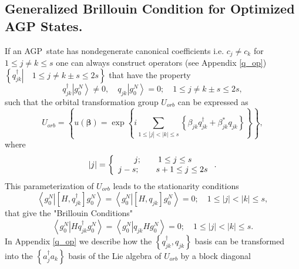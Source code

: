 \documentclass[titlepage]{article}%
\begin{document}
\subsection{Generalized Brillouin Condition for Optimized AGP
States.\label{Brillouin}}

If an AGP\ state has nondegenerate canonical coefficients i.e. $c_{j}\neq
c_{k}$ for $1\leq j\neq k\leq s$ one can \cite{AGPCoherent}\cite{Weiner83a}%
\cite{Kurtz83} always construct operators (see Appendix \ref{q_op}) $\left\{
\left.  q_{jk}^{\dagger}\right\vert \quad1\leq j\neq k\pm s\leq2s\right\}  $
that have the property
\begin{equation}
q_{jk}^{\dagger}\left\vert g_{0}^{N}\right\rangle \neq0,\quad q_{jk}\left\vert
g_{0}^{N}\right\rangle =0;\quad1\leq j\neq k\pm s\leq2s,
\end{equation}
such that the orbital transformation group $U_{orb}$ can be expressed as
\begin{equation}
U_{orb}=\left\{  u\left(  \bm{\beta}\right)  =\exp\left\{  i\sum
_{1\leq\left\vert j\right\vert <\left\vert k\right\vert \leq s}\left\{
\beta_{jk}q_{jk}^{\dagger}+\beta_{jk}^{\ast}q_{jk}\right\}  \right\}
\right\}  ,
\end{equation}
where
\begin{equation}
\left\vert j\right\vert =\left\{
\begin{array}
[c]{c}%
j;\qquad1\leq j\leq s\\
j-s;\qquad s+1\leq j\leq2s
\end{array}
\right.  .
\end{equation}
This parameterization of $U_{orb}$ leads to the stationarity conditions
\begin{equation}
\left\langle \left.  g_{0}^{N}\right\vert \left[  H,q_{jk}^{\dagger}\right]
g_{0}^{N}\right\rangle =\left\langle \left.  g_{0}^{N}\right\vert \left[
H,q_{jk}\right]  g_{0}^{N}\right\rangle =0;\quad1\leq\left\vert j\right\vert
<\left\vert k\right\vert \leq s,
\end{equation}
that give the "Brillouin Conditions"
\begin{equation}
\left\langle \left.  g_{0}^{N}\right\vert Hq_{jk}^{\dagger}g_{0}%
^{N}\right\rangle =\left\langle \left.  g_{0}^{N}\right\vert q_{jk}Hg_{0}%
^{N}\right\rangle =0;\quad1\leq\left\vert j\right\vert <\left\vert
k\right\vert \leq s.\label{BC}%
\end{equation}
In Appendix \ref{q_op} we describe how the $\left\{  q_{jk}^{\dagger}%
,q_{jk}\right\}  $ basis can be transformed into the $\left\{  a_{j}^{\dagger
}a_{k}\right\}  $ basis of the Lie algebra of $U_{orb}$ by a block diagonal
\end{document}
